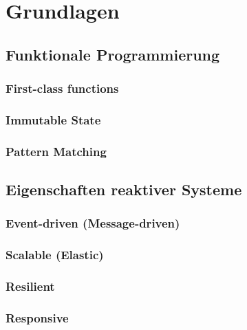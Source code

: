 \chapter{Grundlagen}

\section{Funktionale Programmierung}
\subsection{First-class functions}
\subsection{Immutable State}
\subsection{Pattern Matching}

\section{Eigenschaften reaktiver Systeme}
\subsection{Event-driven (Message-driven)}
\subsection{Scalable (Elastic)}
\subsection{Resilient}
\subsection{Responsive}
